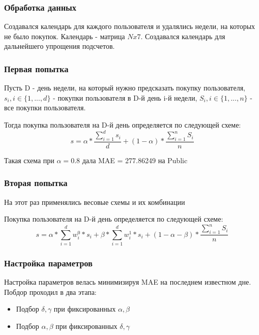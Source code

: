 \documentclass{beamer}
\begin{document}

\begin{frame}
\frametitle{Обработка данных}
Создавался календарь для каждого пользователя и удалялись недели, на которых не было покупок. Календарь - матрица $N x 7$. Создавался календарь для дальнейшего упрощения подсчетов.
\end{frame}


\begin{frame}
\frametitle{Первая попытка}
Пусть D - день недели, на который нужно предсказать покупку пользователя, $s_i, i \in \{1, ..., d\}$ - покупки пользователя в D-й день i-й недели, $S_i, i \in \{1, ..., n\}$ - все покупки пользователя.

Тогда покупка пользователя на D-й день определяется по следующей схеме:
$$s = \alpha * \frac{\sum_{i=1}^{d} s_i}{d} + (1 - \alpha) * \frac{\sum_{i=1}^{n} S_i}{n}$$

Такая схема при $\alpha = 0.8$ дала MAE = 277.86249 на Public
\end{frame}


\begin{frame}
\frametitle{Вторая попытка}
На этот раз применялись весовые схемы и их комбинации

Покупка пользователя на D-й день определяется по следующей схеме:
$$s = \alpha * \sum_{i=1}^{d} w_i^0 * s_i + \beta * \sum_{i=1}^{d} w_i^1 * s_i + (1 - \alpha - \beta) * \frac{\sum_{i=1}^{n} S_i}{n}$$

\end{frame}


\begin{frame}
\frametitle{Настройка параметров}
Настройка параметров велась минимизируя MAE на последнем известном дне. Побдор проходил в два этапа:
\begin{itemize}
\item Подбор $\delta, \gamma$ при фиксированных $\alpha, \beta$
\item Подбор $\alpha, \beta$ при фиксированных $\delta, \gamma$
\end{itemize}

\end{frame}

\end{document}

